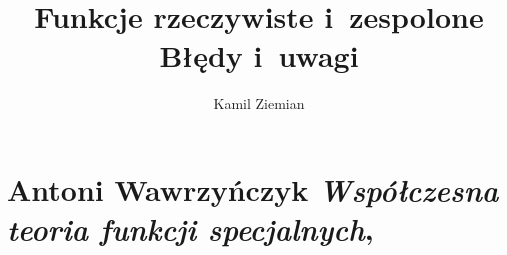 \documentclass[a4paper,11pt]{article}
\title{Funkcje rzeczywiste i~zespolone \\
  {\Large Błędy i~uwagi}}
\author{Kamil Ziemian}
\numberwithin{equation}{section}
\begin{document}





\maketitle





\section{Antoni Wawrzyńczyk
  \textit{Współczesna teoria funkcji specjalnych},
  \parencite{Wawrzynczyk-Wspolczesna-teoria-funkcji-specjalnych-Pub-1978}}








\end{document}
